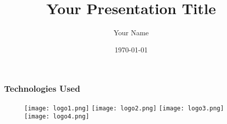 \documentclass{beamer}
\title{Your Presentation Title}
\author{Your Name}
\date{\today}
\begin{document}
    \frame{\titlepage}

    \begin{frame}
        \frametitle{Technologies Used}
        \begin{figure}[h]
            \centering
            \texttt{[image: logo1.png]}
            \texttt{[image: logo2.png]}
            \texttt{[image: logo3.png]}
            \texttt{[image: logo4.png]}
        \end{figure}
    \end{frame}
\end{document}
